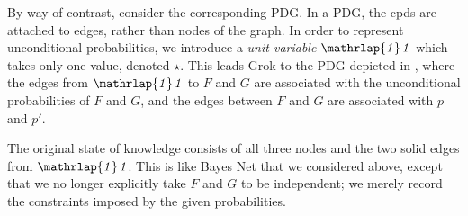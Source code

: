 \documentclass[letterpaper]{article} %
\theoremstyle{plain}
\theoremstyle{definition}
\theoremstyle{remark}
\newcommand\mat[1]{\mathbf{#1}}
\newcommand{\pdgunit}{\mathrlap{\mathit 1} \mspace{2.3mu}\mathit 1}
\begin{document}
\begin{example}
By way of contrast, consider the corresponding PDG. In a PDG, the cpds are
attached to edges, rather than nodes of the graph.
%
In order to represent unconditional probabilities, we introduce
a \emph{unit variable} $\pdgunit$ which 
takes only one value, denoted
$\star$. 
This leads Grok to 
the PDG depicted in ,
where the edges from $\pdgunit$ to $F$ and $G$ are associated with the
unconditional probabilities of $F$ and $G$, and the 
edges between $F$ and $G$ are associated with $p$ and $p'$.



The original state of knowledge consists of all three nodes and the two
solid
edges from $\pdgunit$. This is like Bayes Net that we considered above,
except that we 
no longer
explicitly
%
take  $F$ and $G$ to be independent; we merely record the constraints
imposed by the given probabilities.  
	

\end{example}
\end{document}
